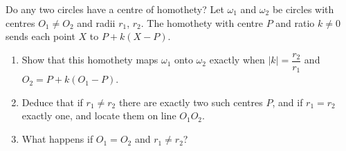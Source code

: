 Do any two circles have a centre of homothety? Let $\omega_1$ and $\omega_2$ be circles with centres $O_1\ne O_2$ and radii $r_1$, $r_2$. The homothety with centre $P$ and ratio $k\ne0$ sends each point $X$ to $P+k(X-P)$.
\begin{enumerate}
\item[(a)] Show that this homothety maps $\omega_1$ onto $\omega_2$ exactly when $|k|=\dfrac{r_2}{r_1}$ and $O_2=P+k(O_1-P)$.
\item[(b)] Deduce that if $r_1\ne r_2$ there are exactly two such centres $P$, and if $r_1=r_2$ exactly one, and locate them on line $O_1O_2$.
\item[(c)] What happens if $O_1=O_2$ and $r_1\ne r_2$?
\end{enumerate}
